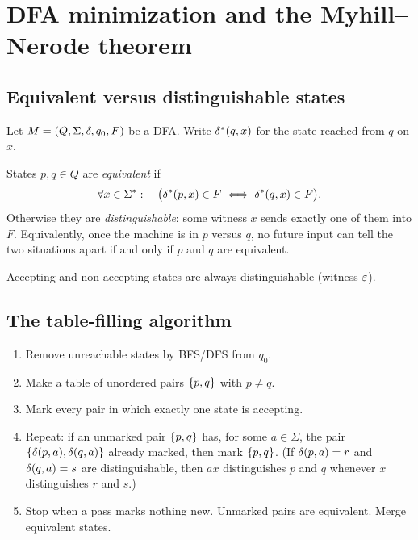 \section{DFA minimization and the Myhill--Nerode theorem}

\subsection{Equivalent versus distinguishable states}
Let $M=(Q,\Sigma,\delta,q_0,F)$ be a DFA. Write
$\delta^*(q,x)$ for the state reached from $q$ on $x$.

\begin{definition}
States $p,q\in Q$ are \emph{equivalent} if
\[
  \forall x\in\Sigma^*:\quad
  \bigl(\delta^*(p,x)\in F
        \iff
        \delta^*(q,x)\in F\bigr).
\]
Otherwise they are \emph{distinguishable}: some witness $x$ sends exactly one
of them into $F$. Equivalently, once the machine is in $p$ versus $q$, no
future input can tell the two situations apart if and only if $p$ and $q$
are equivalent.
\end{definition}
Accepting and non-accepting states are always distinguishable (witness $\varepsilon$).

\subsection{The table-filling algorithm}
\begin{algorithm}
\begin{enumerate}
  \item Remove unreachable states by BFS/DFS from $q_0$.
  \item Make a table of unordered pairs $\{p,q\}$ with $p\neq q$.
  \item Mark every pair in which exactly one state is accepting.
  \item Repeat: if an unmarked pair $\{p,q\}$ has, for some $a\in\Sigma$,
        the pair $\{\delta(p,a),\delta(q,a)\}$ already marked, then
        mark $\{p,q\}$. (If $\delta(p,a)=r$ and $\delta(q,a)=s$ are
        distinguishable, then $ax$ distinguishes $p$ and $q$ whenever $x$
        distinguishes $r$ and $s$.)
  \item Stop when a pass marks nothing new. Unmarked pairs are equivalent.
        Merge equivalent states.
\end{enumerate}
\end{algorithm}

